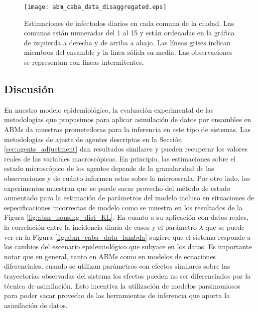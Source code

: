 \begin{figure}[h]
    \centering
    \texttt{[image: abm\_caba\_data\_disaggregated.eps]}
    \caption{Estimaciones de infectados diarios en cada comuna de la ciudad. Las comunas están numeradas del 1 al 15 y están ordenadas en la gráfica de izquierda a derecha y de arriba a abajo. Las líneas grises indican miembros del ensamble y la línea sólida su media. Las observaciones se representan con líneas intermitentes.}
    \label{fig:abm_caba_data_disaggregated}
\end{figure}

\subsection{Discusión}

En nuestro modelo epidemiológico, la evaluación experimental de las metodologías que propusimos para aplicar asimilación de datos por ensambles en ABMs da muestras prometedoras para la inferencia en este tipo de sistemas. Las metodologías de ajuste de agentes descriptas en la Sección \ref{sec:agents_adjustment} dan resultados similares y pueden recuperar los valores reales de las variables macroscópicas. En principio, las estimaciones sobre el estado microscópico de los agentes depende de la granularidad de las observaciones y de cuánto informen estas sobre la microescala. Por otro lado, los experimentos muestran que se puede sacar provecho del método de estado aumentado para la estimación de parámetros del modelo incluso en situaciones de especificaciones incorrectas de modelo como se muestra en los resultados de la Figura \ref{fig:abm_housing_dist_KL}. En cuanto a su aplicación con datos reales, la correlación entre la incidencia diaria de casos y el parámetro $\lambda$ que se puede ver en la Figura \ref{fig:abm_caba_data_lambda} sugiere que el sistema responde a los cambios del escenario epidemiológico que subyace en los datos. Es importante notar que en general, tanto en ABMs como en modelos de ecuaciones diferenciales, cuando se utilizan parámetros con efectos similares sobre las trayectorias observadas del sistema los efectos pueden no ser diferenciados por la técnica de asimilación. Esto incentiva la utilización de modelos parsimoniosos para poder sacar provecho de las herramientas de inferencia que aporta la asimilación de datos.
